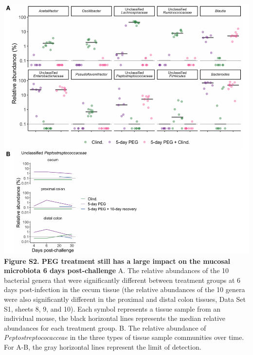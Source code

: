\documentclass[
  11pt,
]{article}
\begin{document}
\includegraphics{figure_S2.pdf} \textbf{Figure S2. PEG treatment still
has a large impact on the mucosal microbiota 6 days post-challenge} A.
The relative abundances of the 10 bacterial genera that were
significantly different between treatment groups at 6 days
post-infection in the cecum tissue (the relative abundances of the 10
genera were also significantly different in the proximal and distal
colon tissues, Data Set S1, sheets 8, 9, and 10). Each symbol represents
a tissue sample from an individual mouse, the black horizontal lines
represents the median relative abundances for each treatment group. B.
The relative abundance of \emph{Peptostreptococacceae} in the three
types of tissue sample communities over time. For A-B, the gray
horizontal lines represent the limit of detection. \newpage
\end{document}
